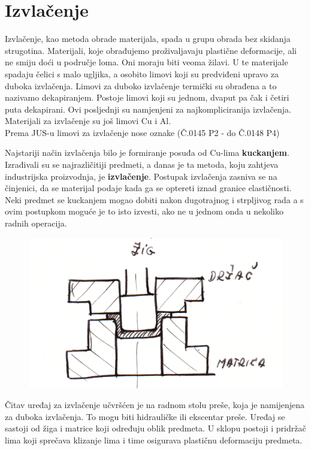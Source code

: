 \documentclass[a4paper,12pt]{article}
\numberwithin{figure}{section}
\begin{document}
\section{Izvlačenje}
Izvlačenje, kao metoda obrade materijala, spada u grupu obrada bez skidanja strugotina. Materijali, koje obrađujemo proživaljavaju plastične deformacije, ali ne smiju doći u područje loma. Oni moraju biti veoma žilavi. U te materijale spadaju čelici s malo ugljika, a osobito limovi koji su  predviđeni upravo za duboka izvlačenja. Limovi za duboko izvlačenje termički su obrađena a to nazivamo dekapiranjem. Postoje limovi koji su jednom, dvaput pa čak i četiri puta dekapirani. Ovi posljednji su namjenjeni za najkompliciranija izvlačenja. Materijali za izvlačenje su još limovi Cu i Al.\\
Prema JUS-u limovi za izvlačenje nose oznake (Č.0145 P2 - do Č.0148 P4)\par  
Najstariji način izvlačenja bilo je formiranje posuđa od Cu-lima \textbf{kuckanjem}. Izrađivali su se najrazličitiji predmeti, a danas je ta metoda, koju zahtjeva industrijska proizvodnja, je \textbf{izvlačenje}. Postupak izvlačenja zasniva se na činjenici, da se materijal podaje kada ga se optereti iznad granice elastičnosti. Neki predmet se kuckanjem mogao dobiti nakon dugotrajnog i strpljivog rada a s ovim postupkom moguće je to isto izvesti, ako ne u jednom onda u nekoliko radnih operacija. \par
\begin{figure}[!h]
\centering
\includegraphics[scale=0.15]{image_45-1.png}
\end{figure}
\FloatBarrier
Čitav uređaj za izvlačenje učvršćen je na radnom stolu preše, koja je namijenjena za duboka izvlačenja. To mogu biti hidrauličke ili ekscentar preše. Uređaj se sastoji od žiga i matrice koji određuju oblik predmeta. U sklopu postoji i pridržač lima koji sprečava klizanje lima i time osigurava plastičnu deformaciju predmeta. \par
\end{document}

